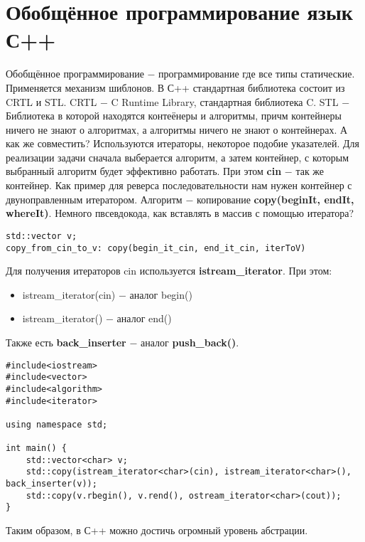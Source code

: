 \documentclass[a4paper, 12pt, titlepage, finall]{extreport}
\begin{document}
        \section{Обобщённое программирование язык С++}
            Обобщённое программирование $-$ программирование где все типы статические.
            Применяется механизм шиблонов. В С++ стандартная библиотека состоит из CRTL и STL.
            CRTL $-$ C Runtime Library, стандартная библиотека C.
            STL $-$ Библиотека в которой находятся контеёнеры и алгоритмы, причм контейнеры ничего не знают о алгоритмах,
            а алгоритмы ничего не знают о контейнерах. А как же совместить? Используются итераторы, некоторое подобие указателей.
            Для реализации задачи сначала выберается алгоритм, а затем контейнер, с которым выбранный алгоритм будет эффективно работать.
            При этом \textbf{cin} $-$ так же контейнер. Как пример для реверса последовательности нам нужен контейнер с двуноправленным 
            итератором. Алгоритм $-$ копирование \textbf{copy(beginIt, endIt, whereIt)}.
            Немного пвсевдокода, как вставлять в массив с помощью итератора?
\begin{lstlisting}
std::vector v;
copy_from_cin_to_v: copy(begin_it_cin, end_it_cin, iterToV)
\end{lstlisting}
            Для получения итераторов cin используется \textbf{istream\_iterator}.
            При этом:
            \begin{itemize}
                \item istream\_iterator(cin) $-$ аналог begin()
                \item istream\_iterator() $-$ аналог end()
            \end{itemize}
            Также есть \textbf{back\_inserter} $-$ аналог \textbf{push\_back()}.

\begin{lstlisting}
#include<iostream>
#include<vector>
#include<algorithm>
#include<iterator>

using namespace std;

int main() {
    std::vector<char> v;
    std::copy(istream_iterator<char>(cin), istream_iterator<char>(), back_inserter(v));
    std::copy(v.rbegin(), v.rend(), ostream_iterator<char>(cout));
}
\end{lstlisting}
            Таким образом, в С++ можно достичь огромный уровень абстрации.
\end{document}
